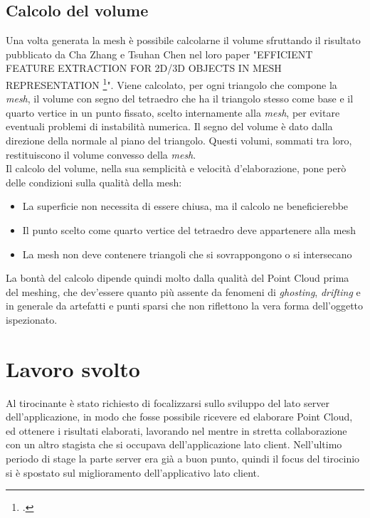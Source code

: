 \subsection{Calcolo del volume}
Una volta generata la mesh è possibile calcolarne il volume sfruttando il risultato pubblicato da Cha Zhang e Tsuhan Chen nel loro paper "EFFICIENT FEATURE EXTRACTION FOR 2D/3D OBJECTS IN MESH REPRESENTATION \footcite{http://research.microsoft.com/en-us/um/people/chazhang/publications/icip01_ChaZhang.pdf}". Viene calcolato, per ogni triangolo che compone la \emph{mesh}, il volume con segno del tetraedro che ha il triangolo stesso come base e il quarto vertice in un punto fissato, scelto internamente alla \emph{mesh}, per evitare eventuali problemi di instabilità numerica. Il segno del volume è dato dalla direzione della normale al piano del triangolo. Questi volumi, sommati tra loro, restituiscono il volume convesso della \emph{mesh}.\\
Il calcolo del volume, nella sua semplicità e velocità d'elaborazione, pone però delle condizioni sulla qualità della mesh:
\begin{itemize}
\item La superficie non necessita di essere chiusa, ma il calcolo ne beneficierebbe
\item Il punto scelto come quarto vertice del tetraedro deve appartenere alla mesh
\item La mesh non deve contenere triangoli che si sovrappongono o si intersecano
\end{itemize}
La bontà del calcolo dipende quindi molto dalla qualità del Point Cloud prima del meshing, che dev'essere quanto più assente da fenomeni di \emph{ghosting}, \emph{drifting} e in generale da artefatti e punti sparsi che non riflettono la vera forma dell'oggetto ispezionato.

\section{Lavoro svolto}
Al tirocinante è stato richiesto di focalizzarsi sullo sviluppo del lato server dell'applicazione, in modo che fosse possibile ricevere ed elaborare Point Cloud, ed ottenere i risultati elaborati, lavorando nel mentre in stretta collaborazione con un altro stagista che si occupava dell'applicazione lato client. Nell'ultimo periodo di stage la parte server era già a buon punto, quindi il focus del tirocinio si è spostato sul miglioramento dell'applicativo lato client.


